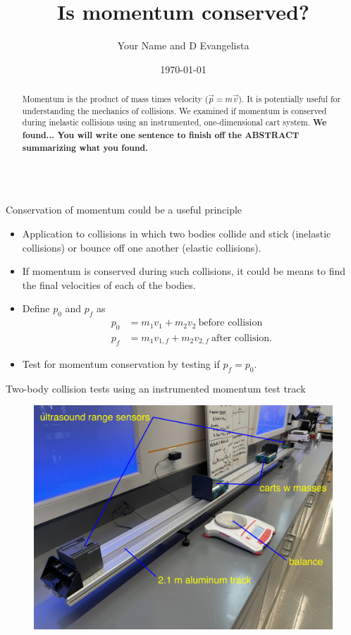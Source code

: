 \documentclass[pdf,serif]{beamer}
\title{Is momentum conserved?}
\author{Your Name and D Evangelista}
\institute{Morristown-Beard School}
\date{\today}
\begin{document}
\begin{frame}{}
\begin{columns}[T,totalwidth=\textwidth]
\begin{column}{14.33in}
\begin{minipage}[t][\textheight]{\linewidth}
\begin{abstract}
Momentum is the product of mass times velocity ($\vec{p}=m\vec{v}$). It is potentially useful for understanding the mechanics of collisions. We examined if momentum is conserved during inelastic collisions using an instrumented, one-dimensional cart system. \textbf{We found... You will write one sentence to finish off the ABSTRACT summarizing what you found.}
\end{abstract}
\vfill
\begin{block}{Conservation of momentum could be a useful principle}
\begin{itemize}
\item Application to collisions in which two bodies collide and stick (inelastic collisions) or bounce off one another (elastic collisions). 
\item If momentum is conserved during such collisions, it could be means to find the final velocities of each of the bodies. 
\item Define $p_0$ and $p_f$ as
\begin{align*}
p_0 &= m_1 v_1 + m_2 v_2\ \text{before collision} \\
p_f &= m_1 v_{1,f} + m_2 v_{2,f}\ \text{after collision}. 
\end{align*}
\item Test for momentum conservation by testing if $p_f=p_0$.
\end{itemize}
\end{block}
\vfill
\begin{block}{Two-body collision tests using an instrumented momentum test track}
\begin{figure}[h]
\begin{center}
\includegraphics[width=0.8\columnwidth]{fig1.png}

\end{center}
\end{figure}
\end{block}
\end{minipage}
\end{column}
\end{columns}
\end{frame}
\end{document}
